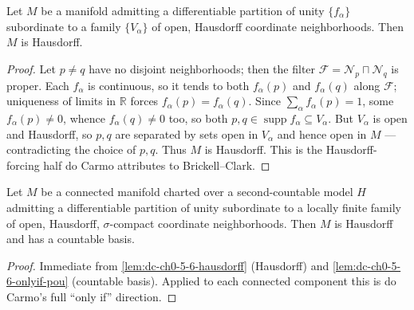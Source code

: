 \begin{lemma}
  \label{lem:dc-ch0-5-6-hausdorff}
  \leanok
  Let $M$ be a manifold admitting a differentiable partition of unity $\{f_\alpha\}$
  subordinate to a family $\{V_\alpha\}$ of open, Hausdorff coordinate neighborhoods. Then
  $M$ is Hausdorff.
\end{lemma}
\begin{proof}
  \leanok
  Let $p\neq q$ have no disjoint neighborhoods; then the filter $\mathcal F=\mathcal N_p
  \sqcap\mathcal N_q$ is proper. Each $f_\alpha$ is continuous, so it tends to both
  $f_\alpha(p)$ and $f_\alpha(q)$ along $\mathcal F$; uniqueness of limits in $\mathbb R$
  forces $f_\alpha(p)=f_\alpha(q)$. Since $\sum_\alpha f_\alpha(p)=1$, some $f_\alpha(p)\neq
  0$, whence $f_\alpha(q)\neq0$ too, so both $p,q\in\operatorname{supp}f_\alpha\subseteq
  V_\alpha$. But $V_\alpha$ is open and Hausdorff, so $p,q$ are separated by sets open in
  $V_\alpha$ and hence open in $M$ — contradicting the choice of $p,q$. Thus $M$ is
  Hausdorff. This is the Hausdorff-forcing half do Carmo attributes to Brickell--Clark.
\end{proof}

\begin{lemma}
  \label{lem:dc-ch0-5-6-onlyif-complete}
  \leanok
  Let $M$ be a connected manifold charted over a second-countable model $H$ admitting a
  differentiable partition of unity subordinate to a locally finite family of open,
  Hausdorff, $\sigma$-compact coordinate neighborhoods. Then $M$ is Hausdorff and has a
  countable basis.
\end{lemma}
\begin{proof}
  \leanok
  Immediate from \cref{lem:dc-ch0-5-6-hausdorff} (Hausdorff) and
  \cref{lem:dc-ch0-5-6-onlyif-pou} (countable basis). Applied to each connected component
  this is do Carmo's full ``only if'' direction.
\end{proof}

